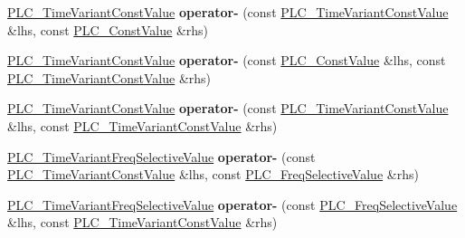 \begin{DoxyCompactItemize}
\item 
\hypertarget{classns3_1_1PLC__TimeVariantConstValue_aa267a4d5872e938dee63534c33abe219}{\hyperlink{classns3_1_1PLC__TimeVariantConstValue}{\-P\-L\-C\-\_\-\-Time\-Variant\-Const\-Value} {\bfseries operator-\/} (const \hyperlink{classns3_1_1PLC__TimeVariantConstValue}{\-P\-L\-C\-\_\-\-Time\-Variant\-Const\-Value} \&lhs, const \hyperlink{classns3_1_1PLC__ConstValue}{\-P\-L\-C\-\_\-\-Const\-Value} \&rhs)}\label{classns3_1_1PLC__TimeVariantConstValue_aa267a4d5872e938dee63534c33abe219}

\item 
\hypertarget{classns3_1_1PLC__TimeVariantConstValue_a45297ea4508e27d407fed4d5e4c8ce6a}{\hyperlink{classns3_1_1PLC__TimeVariantConstValue}{\-P\-L\-C\-\_\-\-Time\-Variant\-Const\-Value} {\bfseries operator-\/} (const \hyperlink{classns3_1_1PLC__ConstValue}{\-P\-L\-C\-\_\-\-Const\-Value} \&lhs, const \hyperlink{classns3_1_1PLC__TimeVariantConstValue}{\-P\-L\-C\-\_\-\-Time\-Variant\-Const\-Value} \&rhs)}\label{classns3_1_1PLC__TimeVariantConstValue_a45297ea4508e27d407fed4d5e4c8ce6a}

\item 
\hypertarget{classns3_1_1PLC__TimeVariantConstValue_a52b616ed32fd490a40c122f5c94bdd7d}{\hyperlink{classns3_1_1PLC__TimeVariantConstValue}{\-P\-L\-C\-\_\-\-Time\-Variant\-Const\-Value} {\bfseries operator-\/} (const \hyperlink{classns3_1_1PLC__TimeVariantConstValue}{\-P\-L\-C\-\_\-\-Time\-Variant\-Const\-Value} \&lhs, const \hyperlink{classns3_1_1PLC__TimeVariantConstValue}{\-P\-L\-C\-\_\-\-Time\-Variant\-Const\-Value} \&rhs)}\label{classns3_1_1PLC__TimeVariantConstValue_a52b616ed32fd490a40c122f5c94bdd7d}

\item 
\hypertarget{classns3_1_1PLC__TimeVariantConstValue_a67c677f135b0983559bc0ac2960e4976}{\hyperlink{classns3_1_1PLC__TimeVariantFreqSelectiveValue}{\-P\-L\-C\-\_\-\-Time\-Variant\-Freq\-Selective\-Value} {\bfseries operator-\/} (const \hyperlink{classns3_1_1PLC__TimeVariantConstValue}{\-P\-L\-C\-\_\-\-Time\-Variant\-Const\-Value} \&lhs, const \hyperlink{classns3_1_1PLC__FreqSelectiveValue}{\-P\-L\-C\-\_\-\-Freq\-Selective\-Value} \&rhs)}\label{classns3_1_1PLC__TimeVariantConstValue_a67c677f135b0983559bc0ac2960e4976}

\item 
\hypertarget{classns3_1_1PLC__TimeVariantConstValue_a22bab1bb6d37a86e6bd3e6b979d911ea}{\hyperlink{classns3_1_1PLC__TimeVariantFreqSelectiveValue}{\-P\-L\-C\-\_\-\-Time\-Variant\-Freq\-Selective\-Value} {\bfseries operator-\/} (const \hyperlink{classns3_1_1PLC__FreqSelectiveValue}{\-P\-L\-C\-\_\-\-Freq\-Selective\-Value} \&lhs, const \hyperlink{classns3_1_1PLC__TimeVariantConstValue}{\-P\-L\-C\-\_\-\-Time\-Variant\-Const\-Value} \&rhs)}\label{classns3_1_1PLC__TimeVariantConstValue_a22bab1bb6d37a86e6bd3e6b979d911ea}


\end{DoxyCompactItemize}
